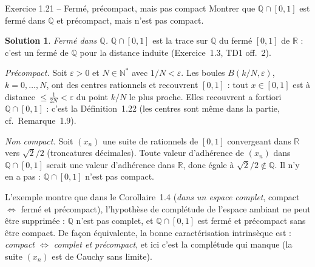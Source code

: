 \documentclass[11pt,a4paper]{article}
\newcommand{\R}{\mathbb{R}}
\newcommand{\N}{\mathbb{N}}
\newcommand{\Q}{\mathbb{Q}}
\theoremstyle{definition}
\newtheorem*{solution}{Solution}
\begin{document}
\begin{exo}{Exercice 1.21 -- Fermé, précompact, mais pas compact}
Montrer que $\Q\cap[0,1]$ est fermé dans $\Q$ et précompact, mais n'est pas compact.
\end{exo}

\begin{solution}
\emph{Fermé dans $\Q$.} $\Q\cap[0,1]$ est la trace sur $\Q$ du fermé $[0,1]$ de $\R$ : c'est un fermé de $\Q$ pour la distance induite (Exercice~1.3, TD1 off.~2).

\emph{Précompact.} Soit $\varepsilon>0$ et $N\in\N^*$ avec $1/N<\varepsilon$. Les boules $B(k/N,\varepsilon)$, $k=0,\dots,N$, ont des centres rationnels et recouvrent $[0,1]$ : tout $x\in[0,1]$ est à distance $\le\frac1{2N}<\varepsilon$ du point $k/N$ le plus proche. Elles recouvrent a fortiori $\Q\cap[0,1]$ : c'est la Définition~1.22 (les centres sont même dans la partie, cf.\ Remarque~1.9).

\emph{Non compact.} Soit $(x_n)$ une suite de rationnels de $[0,1]$ convergeant dans $\R$ vers $\sqrt2/2$ (troncatures décimales). Toute valeur d'adhérence de $(x_n)$ dans $\Q\cap[0,1]$ serait une valeur d'adhérence dans $\R$, donc égale à $\sqrt2/2\notin\Q$. Il n'y en a pas : $\Q\cap[0,1]$ n'est pas compact.
\end{solution}

\begin{pointcle}
L'exemple montre que dans le Corollaire~1.4 (\emph{dans un espace complet}, compact $\iff$ fermé et précompact), l'hypothèse de complétude de l'espace ambiant ne peut être supprimée : $\Q$ n'est pas complet, et $\Q\cap[0,1]$ est fermé et précompact sans être compact. De façon équivalente, la bonne caractérisation intrinsèque est : \emph{compact $\iff$ complet et précompact}, et ici c'est la complétude qui manque (la suite $(x_n)$ est de Cauchy sans limite).
\end{pointcle}
\end{document}
